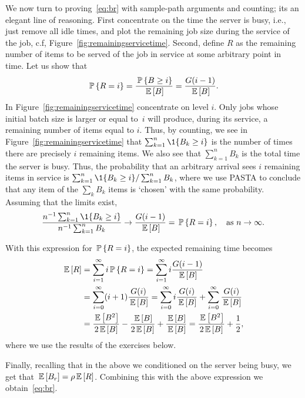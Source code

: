 We now turn to proving~\eqref{eq:br} with sample-path arguments and
counting; its an elegant line of reasoning. First concentrate on the
time the server is busy, i.e., just remove all idle times, and plot
the remaining job size during the service of the job, c.f,
Figure~\ref{fig:remainingservicetime}. Second, define $R$ as the
remaining number of items to be served of the job in service at some
arbitrary point in time. Let us show that
\begin{equation*}
  \P{R=i} =\frac{\P{B\geq i}}{\E B} = \frac{G(i-1)}{\E B}.
\end{equation*}
In Figure~\ref{fig:remainingservicetime} concentrate on level
$i$. Only jobs whose initial batch size is larger or equal to~$i$ will
produce, during its service, a remaining number of items equal to $i$.
Thus, by counting, we see in Figure~\ref{fig:remainingservicetime}
that $\sum_{k=1}^n \1{B_k \geq i}$ is the number of times there are
precisely $i$ remaining items.  We also see  that
$\sum_{k=1}^n B_k$ is the total time the server is busy. Thus, the
probability that an arbitrary arrival sees $i$ remaining items in
service is $\sum_{k=1}^n \1{B_k \geq i}/\sum_{k=1}^n B_k$, where we
use PASTA to conclude that any item of the $\sum_{k} B_k$ items is
`chosen' with the same probability.  Assuming that the limits exist,
\begin{equation*}
  \frac{n^{-1}\sum_{k=1}^n \1{B_k \geq i}}{n^{-1}\sum_{k=1}^n B_k} \to \frac{G(i-1)}{\E B} = \P{R=i}, \quad \text{as  } n\to\infty.
\end{equation*}

With this expression for $\P{R=i}$, the expected remaining time becomes
\begin{equation*}
  \begin{split}
  \E{R} 
&= \sum_{i=1}^\infty i \P{R=i} = \sum_{i=1}^\infty i \frac{G(i-1)}{\E B} \\
&=\sum_{i=0}^\infty (i+1) \frac{G(i)}{\E B} 
=\sum_{i=0}^\infty i \frac{G(i)}{\E B} +
\sum_{i=0}^\infty \frac{G(i)}{\E B}\\
&= \frac{\E{B^2}}{2\E B} - \frac{\E B}{2\E B} + \frac{\E B}{\E B} = \frac{\E{B^2}}{2\E B} + \frac{1}2,
  \end{split}
\end{equation*}
where we use the results of the exercises below.

Finally, recalling that in the above we conditioned on the server
being busy, we get that $\E{B_r} = \rho \E R$.  Combining this with
the above expression we obtain~\eqref{eq:br}.

